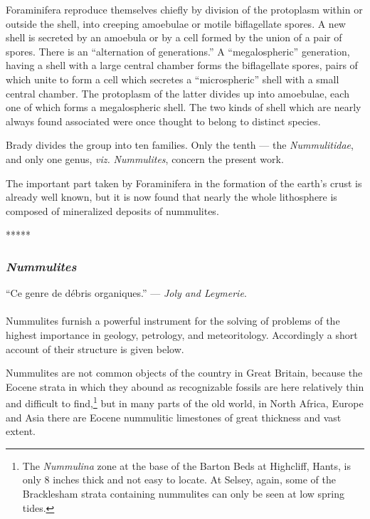 \documentclass[a4paper, 12pt, oneside]{article}
\begin{document}
Foraminifera reproduce themselves chiefly by division of the protoplasm within or outside the shell, into creeping amoebulae or motile biflagellate spores. A new shell is secreted by an amoebula or by a cell formed by the union of a pair of spores. There is an ``alternation of generations.'' A ``megalospheric'' generation, having a shell with a large central chamber forms the biflagellate spores, pairs of which unite to form a cell which secretes a ``microspheric'' shell with a small central chamber. The protoplasm of the latter divides up into amoebulae, each one of which forms a megalospheric shell. The two kinds of shell which are nearly always found associated were once thought to belong to distinct species.

Brady divides the group into ten families. Only the tenth --- the \emph{Nummulitidae}, and only one genus, \emph{viz.} \emph{Nummulites}, concern the present work.

The important part taken by Foraminifera in the formation of the earth's crust is already well known, but it is now found that nearly the whole lithosphere is composed of mineralized deposits of nummulites.

\centerline{*\hspace{15mm}*\hspace{15mm}*\hspace{15mm}*\hspace{15mm}*}
\bigskip

\subsubsection{\emph{Nummulites}}
\begin{displayquote}
``Ce genre de débris organiques.'' --- \emph{Joly and Leymerie}.
\end{displayquote}
\paragraph{}
Nummulites furnish a powerful instrument for the solving of problems of the highest importance in geology, petrology, and meteoritology. Accordingly a short account of their structure is given below.

Nummulites are not common objects of the country in Great Britain, because the Eocene strata in which they abound as recognizable fossils are here relatively thin and difficult to find,\footnote{The \emph{Nummulina} zone at the base of the Barton Beds at Highcliff, Hants, is only 8 inches thick and not easy to locate. At Selsey, again, some of the Bracklesham strata containing nummulites can only be seen at low spring tides.} but in many parts of the old world, in North Africa, Europe and Asia there are Eocene nummulitic limestones of great thickness and vast extent.
\end{document}
